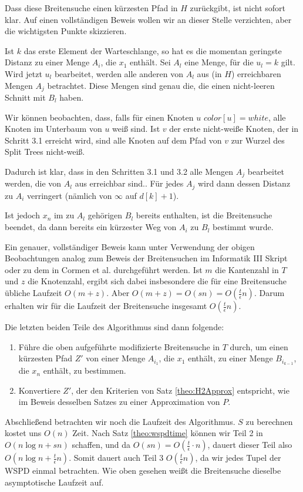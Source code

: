     Dass diese Breitensuche einen kürzesten Pfad in $H$ zurückgibt, ist nicht sofort klar. Auf einen vollständigen Beweis wollen wir an dieser Stelle verzichten, aber die wichtigsten Punkte skizzieren. 
    
    Ist $k$ das erste Element der Warteschlange, so hat es die momentan geringste Distanz zu einer Menge $A_i$, die $x_1$ enthält. Sei $A_l$ eine Menge, für die $u_l = k$ gilt. Wird jetzt $u_l$ bearbeitet, werden alle anderen von $A_l$ aus (in $H$) erreichbaren Mengen $A_j$ betrachtet. Diese Mengen sind genau die, die einen nicht-leeren Schnitt mit $B_l$ haben. 
    
	Wir können beobachten, dass, falls für einen Knoten $u$ $color[u] = white$, alle Knoten im Unterbaum von $u$ weiß sind. Ist $v$ der erste nicht-weiße Knoten, der in Schritt 3.1 erreicht wird, sind alle Knoten auf dem Pfad von $v$ zur Wurzel des Split Trees nicht-weiß.
    
    Dadurch ist klar, dass in den Schritten 3.1 und 3.2 alle Mengen $A_j$ bearbeitet werden, die von $A_l$ aus erreichbar sind.. Für jedes $A_j$ wird dann dessen Distanz zu $A_i$ verringert (nämlich von $\infty$ auf $d[k]+1$). 
    
    Ist jedoch $x_n$ im zu $A_l$ gehörigen $B_l$ bereits enthalten, ist die Breitensuche beendet, da dann bereits ein kürzester Weg von $A_i$ zu $B_l$ bestimmt wurde.
    
    Ein genauer, vollständiger Beweis kann unter Verwendung der obigen Beobachtungen analog zum Beweis der Breitensuchen im Informatik III Skript \cite{hagerup} oder zu dem in Cormen et al. \cite{cormen} durchgeführt werden. Ist $m$ die Kantenzahl in $T$ und $z$ die Knotenzahl, ergibt sich dabei insbesondere die für eine Breitensuche übliche Laufzeit $O(m + z)$. Aber $O(m + z) = O(sn) = O(\frac{t}{\epsilon}n)$. Darum erhalten wir für die Laufzeit der Breitensuche insgesamt $O(\frac{t}{\epsilon}n)$.
    
    Die letzten beiden Teile des Algorithmus sind dann folgende:
    \begin{enumerate}[start=4, topsep=4mm]
    	\item Führe die oben aufgeführte modifizierte Breitensuche in $T$ durch, um einen kürzesten Pfad $Z'$ von einer Menge $A_{i_1}$, die $x_1$ enthält, zu einer Menge $B_{i_{k-1}}$, die $x_n$ enthält, zu bestimmen.
    	\item Konvertiere $Z'$, der den Kriterien von Satz \ref{theo:H2Approx} entspricht, wie im Beweis desselben Satzes zu einer Approximation von $P$.
    \end{enumerate}
    Abschließend betrachten wir noch die Laufzeit des Algorithmus. $S$ zu berechnen kostet uns $O(n)$ Zeit. Nach Satz \ref{theo:wspdtime} können wir Teil 2 in $O(n \log n + sn)$ schaffen, und da $O(sn) = O(\frac{t}{\epsilon}\cdot n)$, dauert dieser Teil also $O(n \log n + \frac{t}{\epsilon}n)$. Somit dauert auch Teil 3 $O(\frac{t}{\epsilon}n)$, da wir jedes Tupel der WSPD einmal betrachten. Wie oben gesehen weißt die Breitensuche dieselbe asymptotische Laufzeit auf. 
    
